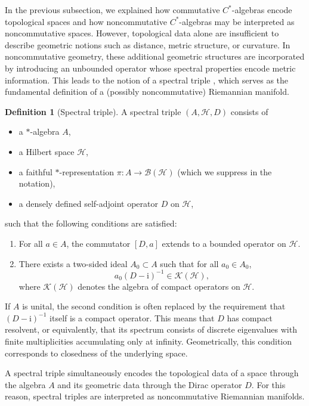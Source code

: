 \documentclass[12pt]{article}
\newcommand{\im}{\mathrm{i}}
\theoremstyle{definition} %
\newtheorem{definition}{Definition}
\theoremstyle{plain} %
\theoremstyle{remark} %
\theoremstyle{underline}
\begin{document}
In the previous subsection, we explained how commutative $C^*$-algebras encode topological spaces and how noncommutative $C^*$-algebras may be interpreted as noncommutative spaces. However, topological data alone are insufficient to describe geometric notions such as distance, metric structure, or curvature. In noncommutative geometry, these additional geometric structures are incorporated by introducing an unbounded operator whose spectral properties encode metric information. This leads to the notion of a spectral triple \cite{Connes1992,connes2013spectral,Connes:1994yd}, which serves as the fundamental definition of a (possibly noncommutative) Riemannian manifold.

\begin{definition}[Spectral triple]
    A spectral triple $(A,\mathcal{H},D)$ consists of
    \begin{itemize}
        \item a $*$-algebra $A$,
        \item a Hilbert space $\mathcal{H}$,
        \item a faithful $*$-representation $\pi:A\to\mathcal{B}(\mathcal{H})$ (which we suppress in the notation),
        \item a densely defined self-adjoint operator $D$ on $\mathcal{H}$,
    \end{itemize}
    such that the following conditions are satisfied:
    \begin{enumerate}
        \item For all $a\in A$, the commutator $[D,a]$ extends to a bounded operator on $\mathcal{H}$.
        \item There exists a two-sided ideal $A_0\subset A$ such that for all $a_0\in A_0$,
        \[
            a_0 (D-\im)^{-1} \in \mathcal{K}(\mathcal{H}),
        \]
        where $\mathcal{K}(\mathcal{H})$ denotes the algebra of compact operators on $\mathcal{H}$.
    \end{enumerate}
\end{definition}

If $A$ is unital, the second condition is often replaced by the requirement that $(D-\im)^{-1}$ itself is a compact operator. This means that $D$ has compact resolvent, or equivalently, that its spectrum consists of discrete eigenvalues with finite multiplicities accumulating only at infinity. Geometrically, this condition corresponds to closedness of the underlying space.

A spectral triple simultaneously encodes the topological data of a space through the algebra $A$ and its geometric data through the Dirac operator $D$. For this reason, spectral triples are interpreted as noncommutative Riemannian manifolds.
\end{document}
